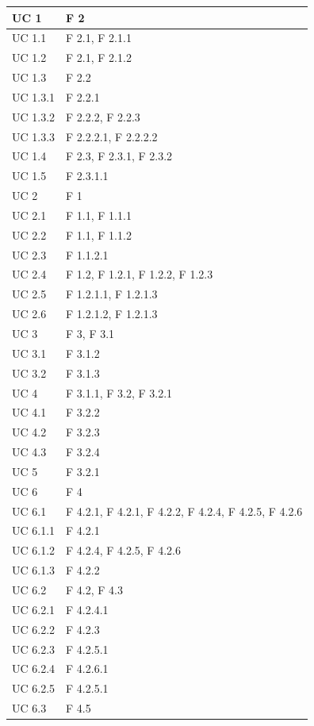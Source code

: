 \documentclass[a4paper,11pt]{article}
\begin{document}
\begin{longtable}{p{}p{}}
UC 1 & F 2\\
\midrule
UC 1.1 & F 2.1, F 2.1.1\\
\midrule
UC 1.2 & F 2.1, F 2.1.2\\
\midrule
UC 1.3 & F 2.2\\
\midrule
UC 1.3.1 & F 2.2.1\\
\midrule
UC 1.3.2 & F 2.2.2, F 2.2.3\\
\midrule
UC 1.3.3 & F 2.2.2.1, F 2.2.2.2\\
\midrule
UC 1.4 & F 2.3, F 2.3.1, F 2.3.2\\
\midrule
UC 1.5 & F 2.3.1.1\\
\midrule
UC 2 & F 1\\
\midrule
UC 2.1 & F 1.1, F 1.1.1\\
\midrule
UC 2.2 & F 1.1, F 1.1.2\\
\midrule
UC 2.3 & F 1.1.2.1\\
\midrule
UC 2.4 & F 1.2, F 1.2.1, F 1.2.2, F 1.2.3\\
\midrule
UC 2.5 & F 1.2.1.1, F 1.2.1.3\\
\midrule
UC 2.6 & F 1.2.1.2, F 1.2.1.3\\
\midrule
UC 3 & F 3, F 3.1\\
\midrule
UC 3.1 & F 3.1.2\\
\midrule
UC 3.2 & F 3.1.3\\
\midrule
UC 4 & F 3.1.1, F 3.2, F 3.2.1\\
\midrule
UC 4.1 & F 3.2.2\\
\midrule
UC 4.2 & F 3.2.3\\
\midrule
UC 4.3 & F 3.2.4\\
\midrule
UC 5 & F 3.2.1\\
\midrule
UC 6 & F 4\\
\midrule
UC 6.1 & F 4.2.1, F 4.2.1, F 4.2.2, F 4.2.4, F 4.2.5, F 4.2.6\\
\midrule
UC 6.1.1 & F 4.2.1\\
\midrule
UC 6.1.2 & F 4.2.4, F 4.2.5, F 4.2.6\\
\midrule
UC 6.1.3 & F 4.2.2\\
\midrule
UC 6.2 & F 4.2, F 4.3\\
\midrule
UC 6.2.1 & F 4.2.4.1\\
\midrule
UC 6.2.2 & F 4.2.3\\
\midrule
UC 6.2.3 & F 4.2.5.1\\
\midrule
UC 6.2.4 & F 4.2.6.1\\
\midrule
UC 6.2.5 & F 4.2.5.1\\
\midrule
UC 6.3 & F 4.5\\

\end{longtable}
\end{document}
